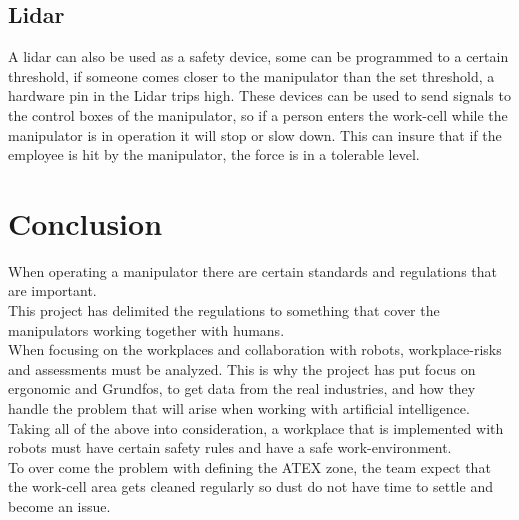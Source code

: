 \subsection{Lidar}
A lidar can also be used as a safety device\cite{Lidar}, some can be programmed to a certain threshold, if someone comes closer to the manipulator than the set threshold, a hardware pin in the Lidar trips high. These devices can be used to send signals to the control boxes of the manipulator, so if a person enters the work-cell while the manipulator is in operation it will stop or slow down. This can insure that if the employee is hit by the manipulator, the force is in a tolerable level.\\



\section{Conclusion}

When operating a manipulator there are certain standards and regulations that are important.\\
This project has delimited the regulations to something that cover the manipulators working together with humans.\\
When focusing on the workplaces and collaboration with robots, workplace-risks and assessments must be analyzed. This is why the project has put focus on ergonomic and Grundfos, to get data from the real industries, and how they handle the problem that will arise when working with artificial intelligence.\\
Taking all of the above into consideration, a workplace that is implemented with robots must have certain safety rules and have a safe work-environment.\\
To over come the problem with defining the ATEX zone, the team expect that the work-cell area gets cleaned regularly so dust do not have time to settle and become an issue.\\

